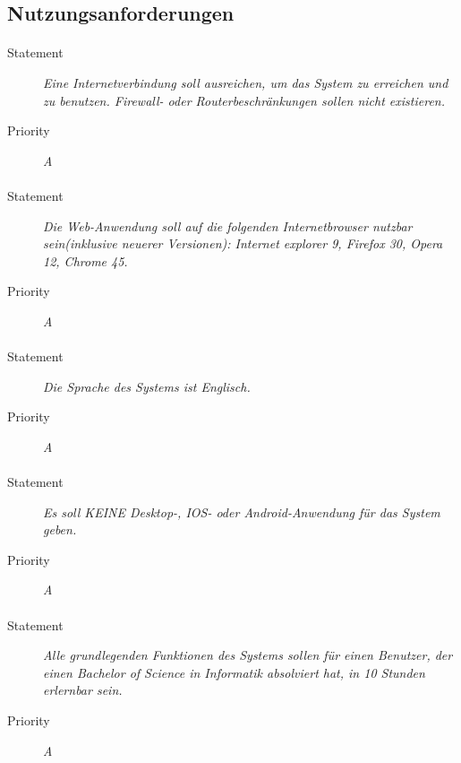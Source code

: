 \subsection{Nutzungsanforderungen}


\paragraph{}
\begin{description}
\item[Statement] \textit{Eine Internetverbindung soll ausreichen, um das System zu erreichen und zu benutzen. Firewall- oder Routerbeschränkungen sollen nicht existieren.}
\item[Priority] \textit{A}
\end{description}

\paragraph{}
\begin{description}
\item[Statement] \textit{Die Web-Anwendung soll auf die folgenden Internetbrowser nutzbar sein(inklusive neuerer Versionen): Internet explorer 9, Firefox 30, Opera 12, Chrome 45.}
\item[Priority] \textit{A}
\end{description}

\paragraph{}
\begin{description}
\item[Statement] \textit{Die Sprache des Systems ist Englisch.}
\item[Priority] \textit{A}
\end{description}

\paragraph{}
\begin{description}
\item[Statement] \textit{Es soll KEINE Desktop-, IOS- oder Android-Anwendung für das System geben.}
\item[Priority] \textit{A}
\end{description}

\paragraph{}
\begin{description}
\item[Statement] \textit{Alle grundlegenden Funktionen des Systems sollen für einen Benutzer, der einen Bachelor of Science in Informatik absolviert hat, in 10 Stunden erlernbar sein.}
\item[Priority] \textit{A}
\end{description}

